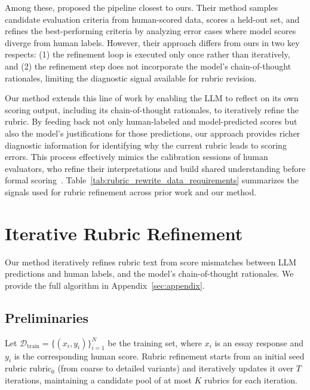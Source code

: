 \documentclass[11pt]{article}
\newcommand{\rubric}{\mathrm{rubric}}
\begin{document}
Among these, \citet{liu-etal-2024-calibrating} proposed the pipeline closest to ours. Their method samples candidate evaluation criteria from human-scored data, scores a held-out set, and refines the best-performing criteria by analyzing error cases where model scores diverge from human labels. However, their approach differs from ours in two key respects: (1) the refinement loop is executed only once rather than iteratively, and (2) the refinement step does not incorporate the model's chain-of-thought rationales, limiting the diagnostic signal available for rubric revision.

Our method extends this line of work by enabling the LLM to reflect on its own scoring output, including its chain-of-thought rationales, to iteratively refine the rubric. By feeding back not only human-labeled and model-predicted scores but also the model's justifications for those predictions, our approach provides richer diagnostic information for identifying why the current rubric leads to scoring errors. This process effectively mimics the calibration sessions of human evaluators, who refine their interpretations and build shared understanding before formal scoring~\citep{trace2016rubricsnegotiate,ozfidan2022rubricdev,yoo-etal-2025-dress}. Table~\ref{tab:rubric_rewrite_data_requirements} summarizes the signals used for rubric refinement across prior work and our method.




\section{Iterative Rubric Refinement}
\label{sec:method}
Our method iteratively refines rubric text from score mismatches between LLM predictions and human labels, and the model's chain-of-thought rationales. We provide the full algorithm in Appendix~\ref{sec:appendix}.

\subsection{Preliminaries}
Let \(\mathcal{D}_{\mathrm{train}}=\{(x_i,y_i)\}_{i=1}^{N}\) be the training set, where \(x_i\) is an essay response and \(y_i\) is the corresponding human score. Rubric refinement starts from an initial seed rubric \(\rubric_0\) (from coarse to detailed variants) and iteratively updates it over \(T\) iterations, maintaining a candidate pool of at most \(K\) rubrics for each iteration. 
\end{document}
